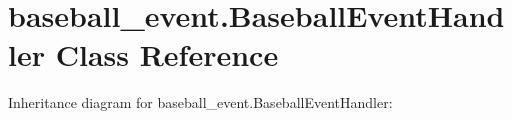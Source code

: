 \hypertarget{classbaseball__event_1_1_baseball_event_handler}{}\section{baseball\+\_\+event.\+Baseball\+Event\+Handler Class Reference}
\label{classbaseball__event_1_1_baseball_event_handler}


Inheritance diagram for baseball\+\_\+event.\+Baseball\+Event\+Handler\+:
